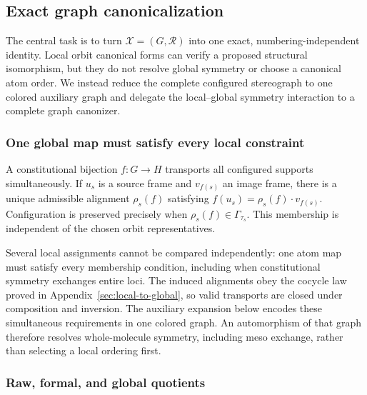 \documentclass[pdflatex,sn-mathphys-num,referee,lineno]{sn-jnl}
\theoremstyle{plain}
\theoremstyle{remark}
\theoremstyle{definition}
\begin{document}
\subsection{Exact graph canonicalization}
\label{sec:canonicalization}

The central task is to turn \(\mathcal X=(G,\mathcal R)\) into one exact,
numbering-independent identity.  Local orbit canonical forms can verify a
proposed structural isomorphism, but they do not resolve global symmetry or
choose a canonical atom order.  We instead reduce the complete configured
stereograph to one colored auxiliary graph and delegate the local--global
symmetry interaction to a complete graph canonizer.

\subsubsection{One global map must satisfy every local constraint}
\label{sec:global-constraints}

A constitutional bijection \(f:G\to H\) transports all configured supports
simultaneously. If \(u_s\) is a source frame and \(v_{f(s)}\) an image frame,
there is a unique admissible alignment \(\rho_s(f)\) satisfying
\(f(u_s)=\rho_s(f)\cdot v_{f(s)}\). Configuration is preserved precisely when
\(\rho_s(f)\in\Gamma_{\tau_s}\). This membership is independent of the
chosen orbit representatives.

Several local assignments cannot be compared independently: one atom map
must satisfy every membership condition, including when constitutional
symmetry exchanges entire loci. The induced alignments obey the cocycle law
proved in Appendix~\ref{sec:local-to-global}, so valid transports are closed
under composition and inversion. The auxiliary expansion below encodes these
simultaneous requirements in one colored graph. An automorphism of that graph
therefore resolves whole-molecule symmetry, including meso exchange, rather
than selecting a local ordering first.

\subsubsection{Raw, formal, and global quotients}
\label{sec:quotient-hierarchy}
\end{document}
